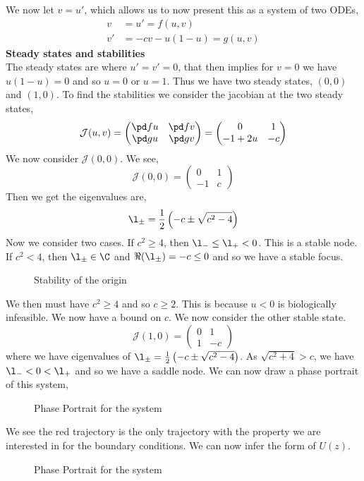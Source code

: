 \noindent
We now let $v = u'$, which allows us to now present this as a system of two ODEs,
\begin{equation}
  \begin{aligned}
    v &= u' = f(u, v)\\
    v' &= -cv - u(1 - u) = g(u, v)
  \end{aligned}
\end{equation}
\textbf{Steady states and stabilities} \\
The steady states are where $u' = v' = 0$, that then implies for $v = 0$ we have $u(1 - u) = 0$ and so $u = 0$ or $u = 1$. Thus we have two steady states, $(0, 0)$ and $(1, 0)$. To find the stabilities we consider the jacobian at the two steady states,
$$ \mathcal{J}(u, v) = \begin{pmatrix}
  \pd f u & \pd f v \\
  \pd g u & \pd g v
\end{pmatrix} = \begin{pmatrix}
  0 & 1 \\ -1 + 2u & -c
\end{pmatrix} $$
We now consider $\mathcal{J}(0, 0)$. We see,
$$ \mathcal{J}(0, 0) = \begin{pmatrix}
  0 & 1 \\ -1 & c
\end{pmatrix} $$
Then we get the eigenvalues are,
$$ \l_{\pm} = \frac{1}{2}\left( -c \pm \sqrt{c^2 - 4} \right) $$
Now we consider two cases. If $c^2 \ge 4$, then $\l_{-} \le \l_+ < 0$. This is a stable node. If $c^2 < 4$, then $\l_\pm \in \C$ and $\Re(\l_\pm) = -c \le 0$ and so we have a stable focus.

\begin{figure}[!ht]
\centering
\resizebox{0.3\textwidth}{!}{}
\caption{Stability of the origin}
\end{figure}

\noindent
We then must have $c^2 \ge 4$ and so $c \ge 2$. This is because $u < 0$ is biologically infeasible. We now have a bound on $c$. We now consider the other stable state.
$$ \mathcal{J}(1, 0) =  \begin{pmatrix}
  0 & 1 \\ 1 & -c
\end{pmatrix}$$
where we have eigenvalues of $\l_\pm = \frac{1}{2}\left( -c \pm \sqrt{c^2 - 4} \right)$. As $\sqrt{c^2 + 4} > c$, we have $\l_{-} < 0 < \l_+$ and so we have a saddle node. We can now draw a phase portrait of this system,

\begin{figure}[!ht]
\centering
\resizebox{0.5\textwidth}{!}{}
\caption{Phase Portrait for the system}
\end{figure}

\noindent
We see the red trajectory is the only trajectory with the property we are interested in for the boundary conditions. We can now infer the form of $U(z)$.

\begin{figure}[!ht]
\centering
\resizebox{0.6\textwidth}{!}{}
\caption{Phase Portrait for the system}
\end{figure}